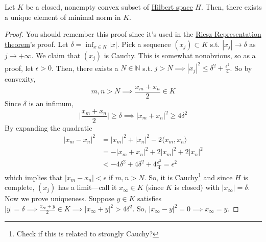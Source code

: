 	\begin{lemma}
	  \label{thm:nearest-point-in-a-closed-convex-subset-of-a}
 
	  Let $K$ be a closed, nonempty convex subset of \hyperref[def:hilbert-space]{Hilbert space} $H$. Then, there exists a unique element of minimal norm in $K$. 
	\end{lemma}
	\begin{proof}
		You should remember this proof since it's used in the \hyperref[thm:riesz-representation-theorem]{Riesz Representation theorem}'s proof. Let $\delta = \inf_{x \in K} |x|$. Pick a sequence $(x_j) \subset K$ s.t. $|x_j| \to \delta$ as $j \to +\infty$. We claim that $(x_j)$ is Cauchy. This is somewhat nonobvious, so as a proof, let $\epsilon > 0$. Then, there exists a $N \in \mathbb{N}$ s.t. $j > N \implies |x_j|^2 \leq \delta^2 + \frac{\epsilon^2}{4}$. So by convexity, 
		\begin{equation}
			m, n > N \implies \frac{x_m + x_n}{2} \in K
		\end{equation}
		Since $\delta$ is an infimum, 
		\begin{equation}
			\bigg| \frac{x_m + x_n}{2} \bigg| \geq \delta \implies |x_m + x_n|^2 \geq 4 \delta^2
		\end{equation}
		By expanding the quadratic 
		\begin{align}
			|x_m - x_n|^2 & = |x_m|^2 + |x_n|^2 - 2 \langle x_m, x_n \rangle \\ 
										& = - |x_m + x_n|^2 + 2|x_m|^2 + 2|x_n|^2 \\ 
										& < - 4 \delta^2 + 4 \delta^2 + 4 \frac{\epsilon^2}{4} = \epsilon^2
		\end{align} 
		which implies that $|x_m - x_n| < \epsilon$ if $m, n > N$. So, it is Cauchy\footnote{Check if this is related to strongly Cauchy?} and since $H$ is complete, $(x_j)$ has a limit---call it $x_\infty \in K$ (since $K$ is closed) with $|x_\infty| = \delta$. Now we prove uniqueness. Suppose $y \in K$ satisfies $|y| = \delta \implies \frac{x_\infty + y}{2} \in K \implies |x_\infty + y|^2 > 4 \delta^2$. So, $|x_\infty - y|^2 = 0 \implies x_\infty = y$. 
	\end{proof}
    
